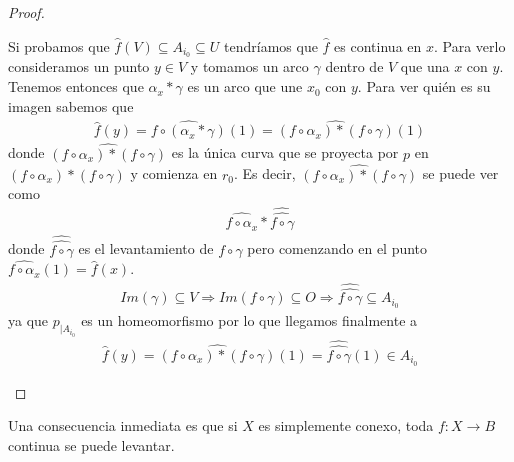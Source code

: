 \begin{teo}
\begin{proof}
\begin{itemize}
            Si probamos que $\hat{f}(V)\subseteq A_{i_0}\subseteq U$ tendríamos que $\hat{f}$ es continua en $x$. Para verlo consideramos un punto $y\in V$ y tomamos un arco $\gamma$ dentro de $V$ que una $x$ con $y$. Tenemos entonces que $\alpha_x\ast \gamma$ es un arco que une $x_0$ con $y$. Para ver quién es su imagen sabemos que 
            \begin{gather*}
                \hat{f}(y) = \widehat{f \circ (\alpha_x \ast \gamma)}(1) = \widehat{(f\circ \alpha_x) \ast (f\circ \gamma)}(1) 
            \end{gather*}
            donde $\widehat{(f\circ \alpha_x) \ast (f\circ \gamma)}$ es la única curva que se proyecta por $p$ en $(f\circ \alpha_x) \ast (f\circ \gamma)$ y comienza en $r_0$. Es decir, $\widehat{(f\circ \alpha_x) \ast (f\circ \gamma)}$ se puede ver como 
            \begin{gather*}
                \widehat{f\circ \alpha_x} \ast \widehat{\widehat{f\circ \gamma}}
            \end{gather*}
            donde $\widehat{\widehat{f\circ \gamma}}$ es el levantamiento de $f\circ \gamma$ pero comenzando en el punto $\widehat{f \circ \alpha_x}(1) = \hat{f}(x)$.
            \begin{gather*}
                Im(\gamma) \subseteq V \Rightarrow Im(f\circ \gamma)\subseteq O \Rightarrow \widehat{\widehat{f\circ \gamma}} \subseteq A_{i_0}
            \end{gather*}
            ya que $p_{|A_{i_0}}$ es un homeomorfismo por lo que llegamos finalmente a 
            \begin{gather*}
                \hat{f}(y) = \widehat{(f\circ \alpha_x) \ast (f\circ \gamma)}(1) = \widehat{\widehat{f\circ \gamma}}(1)\in A_{i_0}
            \end{gather*}
        \end{itemize}
    \end{proof}
\end{teo}

\begin{observacion}
    Una consecuencia inmediata es que si $X$ es simplemente conexo, toda $f:X\to B$ continua se puede levantar.
\end{observacion}

